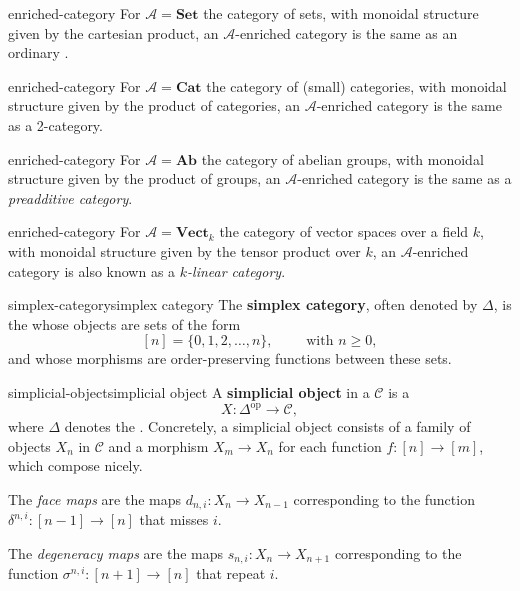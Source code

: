 \begin{example}{enriched-category}
    For $\mathcal{A} = \textbf{Set}$ the category of sets, with monoidal structure given by the cartesian product, an $\mathcal{A}$-enriched category is the same as an ordinary .
\end{example}

\begin{example}{enriched-category}
    For $\mathcal{A} = \textbf{Cat}$ the category of (small) categories, with monoidal structure given by the product of categories, an $\mathcal{A}$-enriched category is the same as a 2-category.
\end{example}

\begin{example}{enriched-category}
    For $\mathcal{A} = \textbf{Ab}$ the category of abelian groups, with monoidal structure given by the product of groups, an $\mathcal{A}$-enriched category is the same as a \textit{preadditive category}.
\end{example}

\begin{example}{enriched-category}
    For $\mathcal{A} = \textbf{Vect}_k$ the category of vector spaces over a field $k$, with monoidal structure given by the tensor product over $k$, an $\mathcal{A}$-enriched category is also known as a \textit{$k$-linear category}.
\end{example}

\begin{topic}{simplex-category}{simplex category}
    The \textbf{simplex category}, often denoted by $\Delta$, is the  whose objects are sets of the form
    \[ [n] = \{ 0, 1, 2, \ldots, n \}, \qquad \text{ with } n \ge 0 , \]
    and whose morphisms are order-preserving functions between these sets.
\end{topic}

\begin{topic}{simplicial-object}{simplicial object}
    A \textbf{simplicial object} in a  $\mathcal{C}$ is a 
    \[ X : \Delta^\text{op} \to \mathcal{C} , \]
    where $\Delta$ denotes the . Concretely, a simplicial object consists of a family of objects $X_n$ in $\mathcal{C}$ and a morphism $X_m \to X_n$ for each function $f : [n] \to [m]$, which compose nicely.
    
    The \textit{face maps} are the maps $d_{n, i} : X_n \to X_{n - 1}$ corresponding to the function $\delta^{n, i} : [n - 1] \to [n]$ that misses $i$.
    
    The \textit{degeneracy maps} are the maps $s_{n, i} : X_n \to X_{n + 1}$ corresponding to the function $\sigma^{n, i} : [n + 1] \to [n]$ that repeat $i$.
\end{topic}


